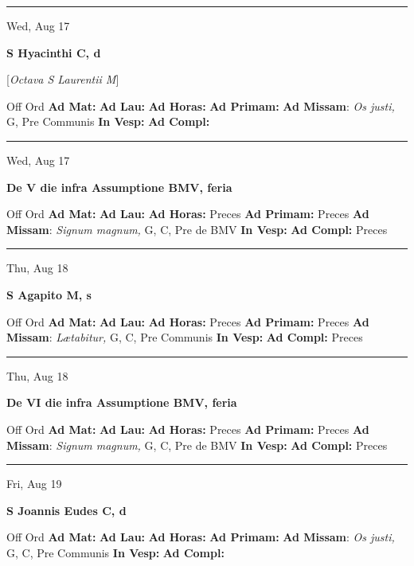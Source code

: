 \documentclass[letterpaper, 10pt]{article}
\begin{document}
\hrule
\begin{center}
Wed, Aug 17
\end{center}\textbf{ \large S Hyacinthi C, \textnormal{\normalsize d}}

[\textit{Octava S Laurentii M}]
\begin{justify}
Off Ord
\textbf{Ad Mat: }
\textbf{Ad Lau: }
\textbf{Ad Horas: }
\textbf{Ad Primam: }
\textbf{Ad Missam}: \textit{Os justi,} G, Pre Communis
\textbf{In Vesp: }
\textbf{Ad Compl: }\end{justify}



\hrule
\begin{center}
Wed, Aug 17
\end{center}\textbf{ \large De V die infra Assumptione BMV, \textnormal{\normalsize feria}}
\begin{justify}
Off Ord
\textbf{Ad Mat: }
\textbf{Ad Lau: }
\textbf{Ad Horas: }Preces
\textbf{Ad Primam: }Preces
\textbf{Ad Missam}: \textit{Signum magnum,} G, C, Pre de BMV
\textbf{In Vesp: }
\textbf{Ad Compl: }Preces\end{justify}



\hrule
\begin{center}
Thu, Aug 18
\end{center}\textbf{ \large S Agapito M, \textnormal{\normalsize s}}
\begin{justify}
Off Ord
\textbf{Ad Mat: }
\textbf{Ad Lau: }
\textbf{Ad Horas: }Preces
\textbf{Ad Primam: }Preces
\textbf{Ad Missam}: \textit{Lætabitur,} G, C, Pre Communis
\textbf{In Vesp: }
\textbf{Ad Compl: }Preces\end{justify}



\hrule
\begin{center}
Thu, Aug 18
\end{center}\textbf{ \large De VI die infra Assumptione BMV, \textnormal{\normalsize feria}}
\begin{justify}
Off Ord
\textbf{Ad Mat: }
\textbf{Ad Lau: }
\textbf{Ad Horas: }Preces
\textbf{Ad Primam: }Preces
\textbf{Ad Missam}: \textit{Signum magnum,} G, C, Pre de BMV
\textbf{In Vesp: }
\textbf{Ad Compl: }Preces\end{justify}



\hrule
\begin{center}
Fri, Aug 19
\end{center}\textbf{ \large S Joannis Eudes C, \textnormal{\normalsize d}}
\begin{justify}
Off Ord
\textbf{Ad Mat: }
\textbf{Ad Lau: }
\textbf{Ad Horas: }
\textbf{Ad Primam: }
\textbf{Ad Missam}: \textit{Os justi,} G, C, Pre Communis
\textbf{In Vesp: }
\textbf{Ad Compl: }\end{justify}
\end{document}
